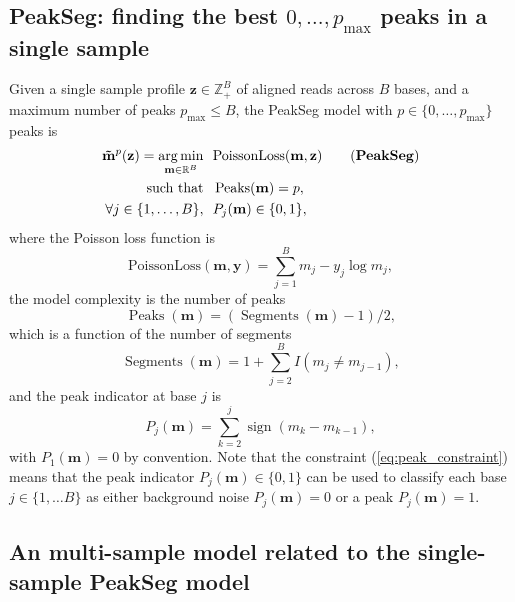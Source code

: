 \documentclass{article} %
\DeclareMathOperator*{\argmin}{arg\,min}
\DeclareMathOperator*{\Peaks}{Peaks}
\DeclareMathOperator*{\Segments}{Segments}
\newcommand{\sign}{\operatorname{sign}}
\newcommand{\RR}{\mathbb R}
\newcommand{\ZZ}{\mathbb Z}
\begin{document}
\subsection{PeakSeg: finding the best $0,\dots,p_{\text{max}}$ peaks
  in a single sample}

Given a single sample profile $\mathbf z\in\ZZ_+^B$ of aligned reads
across $B$ bases, and a maximum number of peaks $p_{\text{max}}\leq
B$, the PeakSeg model with $p\in\{0, \dots, p_{\text{max}}\}$ peaks is
\begin{align}
  \label{PeakSeg}
  \mathbf{\tilde m}^p(\mathbf z)  =
    \argmin_{\mathbf m\in\RR^{B}} &\ \ 
    \text{PoissonLoss}(\mathbf m, \mathbf z) 
    \tag{\textbf{PeakSeg}}
\\
    \text{such that} &\ \  \Peaks(\mathbf m)=p,  \\
     \forall j\in\{1, \dots, B\}, &\ \ P_j(\mathbf m) \in\{0, 1\},
    \label{eq:peak_constraint}
\end{align}
where the Poisson loss function is
\begin{equation}\label{eq:rho}
  \text{PoissonLoss}(\mathbf m, \mathbf y)= \sum_{j=1}^B m_j - y_j \log m_j,
\end{equation} 
the model complexity is the number of peaks
\begin{equation}
  \Peaks(\mathbf m)=(\Segments(\mathbf m)-1)/2,
\end{equation}
which is a function of the number of segments
\begin{equation}
  \Segments(\mathbf m)=1+\sum_{j=2}^B I(m_j \neq m_{j-1}),
\end{equation}
and the peak indicator at base $j$ is
\begin{equation}
  \label{eq:peaks}
  P_j(\mathbf m) = \sum_{k=2}^j \sign( m_{k} - m_{k-1} ),
\end{equation}
with $P_1(\mathbf m)=0$ by convention. Note that the constraint
(\ref{eq:peak_constraint}) means that the peak indicator $P_j(\mathbf
m)\in\{0, 1\}$ can be used to classify each base $j\in\{1,\dots B\}$
as either background noise $P_j(\mathbf m)=0$ or a peak $P_j(\mathbf
m)=1$.

\subsection{An multi-sample model 
  related to the single-sample PeakSeg
  model}
\end{document}
